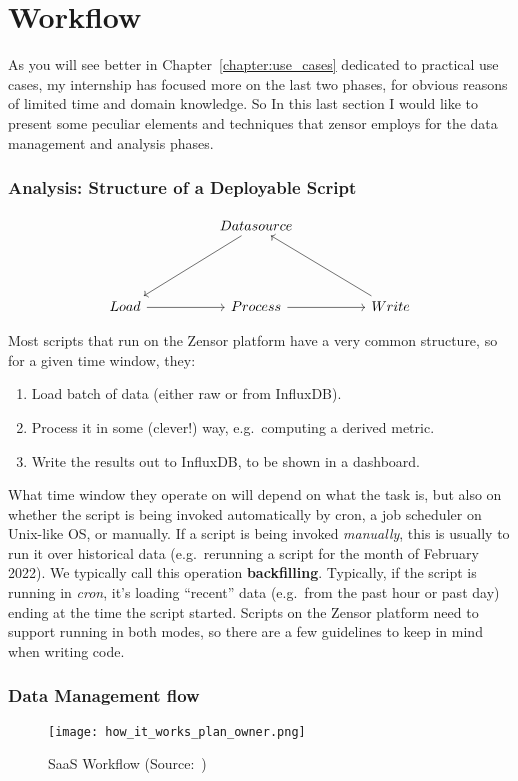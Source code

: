 \section{Workflow}
As you will see better in Chapter~\ref{chapter:use_cases} dedicated to practical use cases, my internship has focused more on the last two phases, for obvious reasons of limited time and domain knowledge.
So In this last section I would like to present some peculiar elements and techniques that zensor employs for the data management and analysis phases.


\subsubsection{Analysis: Structure of a Deployable Script}\label{subsection:script_structure}
\[\begin{tikzcd}
		&& Datasource \\
		&& {} \\
		Load && Process && Write
		\arrow[from=3-1, to=3-3]
		\arrow[from=3-3, to=3-5]
		\arrow[from=1-3, to=3-1]
		\arrow[from=3-5, to=1-3]
	\end{tikzcd}\]

Most scripts that run on the Zensor platform have a very common structure, so for a given time window, they:
\begin{enumerate}
	\item Load batch of data (either raw or from InfluxDB).
	\item Process it in some (clever!) way, e.g.\ computing a derived metric.
	\item Write the results out to InfluxDB, to be shown in a dashboard.
\end{enumerate}
What time window they operate on will depend on what the task is, but also on whether the script is being invoked automatically by cron, a job scheduler on Unix-like OS, or manually.
If a script is being invoked \textit{manually}, this is usually to run it over historical data (e.g.\ rerunning a script for the month of February 2022). We typically call this operation \textbf{backfilling}.
Typically, if the script is running in \textit{cron}, it's loading ``recent'' data (e.g.\ from the past hour or past day) ending at the time the script started.
Scripts on the Zensor platform need to support running in both modes, so there are a few guidelines to keep in mind when writing code.

\subsubsection{Data Management flow}
\begin{figure}[ht]
	\centering
	\texttt{[image: how\_it\_works\_plan\_owner.png]}
	\caption{\acl{SaaS} Workflow (Source:~\cite{Misc:zensor_official_website})}
	\label{fig:zensor_flow}
\end{figure}